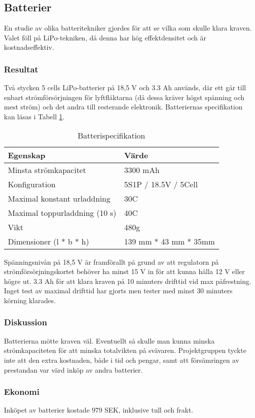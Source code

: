 \subsection{Batterier}
En studie av olika batteritekniker gjordes för att se vilka som skulle klara
kraven. Valet föll på LiPo-tekniken, då denna har hög effektdensitet och är
kostnadseffektiv.

\subsubsection{Resultat}
Två stycken 5 cells LiPo-batterier på 18,5 V och 3.3 Ah används, där ett går
till enbart strömförsörjningen för lyftfläktarna (då dessa kräver högst spänning
och mest ström) och det andra till resterande elektronik. Batteriernas
specifikation kan läsas i Tabell \ref{tbl:Battery}.

\begin{table}[htbp!]
\centering
\caption{Batterispecifikation}
\label{tbl:Battery}
\begin{tabular}{l|l}
Egenskap & Värde \\
\hline
Minsta strömkapacitet & 3300 mAh\\
Konfiguration & 5S1P / 18.5V / 5Cell\\
Maximal konstant urladdning & 30C\\
Maximal toppurladdning (10 s) & 40C\\
Vikt & 480g\\
Dimensioner (l * b * h) & 139 mm * 43 mm * 35mm\\
\end{tabular}
\end{table}

Spänningsnivån på 18,5 V är framförallt på grund av att regulatorn på
strömförsörjningskortet behöver ha minst 15 V in för att kunna hålla 12 V eller
högre ut. 3.3 Ah för att klara kraven på 10 minuters drifttid vid max
påfrestning. Inget test av maximal drifttid har gjorts men tester med minst 30
minuters körning klarades.

\subsubsection{Diskussion}
Batterierna mötte kraven väl. Eventuellt så skulle man kunna minska
strömkapaciteten för att minska totalvikten på svävaren. Projektgruppen tyckte
inte att den extra kostnaden, både i tid och pengar, samt
att försämringen av prestandan var värd inköp av andra batterier.

\subsubsection{Ekonomi}
Inköpet av batterier kostade 979 SEK, inklusive tull och frakt.
